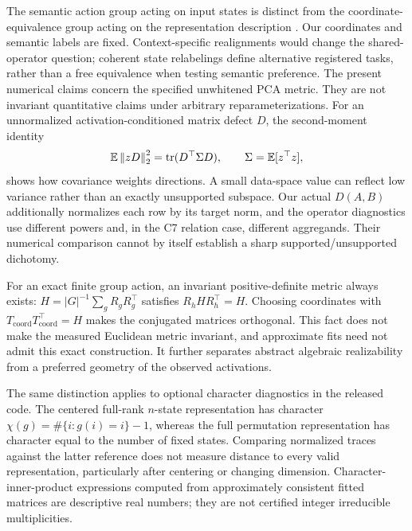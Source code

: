 The semantic action group acting on input states is distinct from the coordinate-equivalence group acting on the representation description \citep{yao2026groupaction}. Our coordinates and semantic labels are fixed. Context-specific realignments would change the shared-operator question; coherent state relabelings define alternative registered tasks, rather than a free equivalence when testing semantic preference. The present numerical claims concern the specified unwhitened PCA metric. They are not invariant quantitative claims under arbitrary reparameterizations. For an unnormalized activation-conditioned matrix defect $D$, the second-moment identity
\[
 \mathbb{E}\left\lVert zD\right\rVert_2^2=\operatorname{tr}(D^\top\Sigma D),\qquad
 \Sigma=\mathbb{E}[z^\top z],
\]
shows how covariance weights directions. A small data-space value can reflect low variance rather than an exactly unsupported subspace. Our actual $D(A,B)$ additionally normalizes each row by its target norm, and the operator diagnostics use different powers and, in the C7 relation case, different aggregands. Their numerical comparison cannot by itself establish a sharp supported/unsupported dichotomy.


For an exact finite group action, an invariant positive-definite metric always exists: $H=|G|^{-1}\sum_gR_gR_g^\top$ satisfies $R_hHR_h^\top=H$. Choosing coordinates with $T_{\mathrm{coord}}T_{\mathrm{coord}}^\top=H$ makes the conjugated matrices orthogonal. This fact does not make the measured Euclidean metric invariant, and approximate fits need not admit this exact construction. It further separates abstract algebraic realizability from a preferred geometry of the observed activations.

The same distinction applies to optional character diagnostics in the released code. The centered full-rank $n$-state representation has character $\chi(g)=\#\{i:g(i)=i\}-1$, whereas the full permutation representation has character equal to the number of fixed states. Comparing normalized traces against the latter reference does not measure distance to every valid representation, particularly after centering or changing dimension. Character-inner-product expressions computed from approximately consistent fitted matrices are descriptive real numbers; they are not certified integer irreducible multiplicities.
